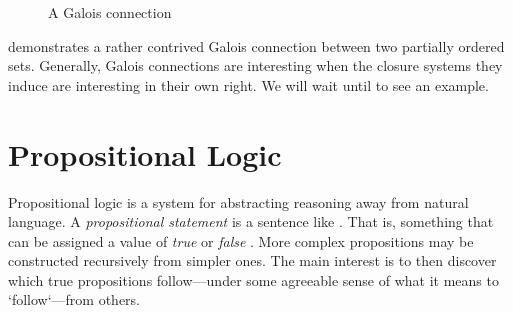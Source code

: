 \begin{figure}[H]
  \caption{A Galois connection}
  \label{figure:Galois-connection}
\end{figure}

 demonstrates a rather contrived Galois connection between two partially ordered sets. Generally, Galois connections are interesting when the closure systems they induce
are interesting in their own right. We will wait until  to see an example.

\section{Propositional Logic}
\label{section:propositional-logic}

Propositional logic is a system for abstracting reasoning away from natural language. A \textit{propositional statement} is a sentence like . That is, something that can
be assigned a value of \textit{true} or \textit{false} \cite[p. 7]{Ben1993Mathematical}. More complex propositions may be constructed recursively from simpler ones. The main interest is to then discover
which true propositions follow---under some agreeable sense of what it means to `follow`---from others.

